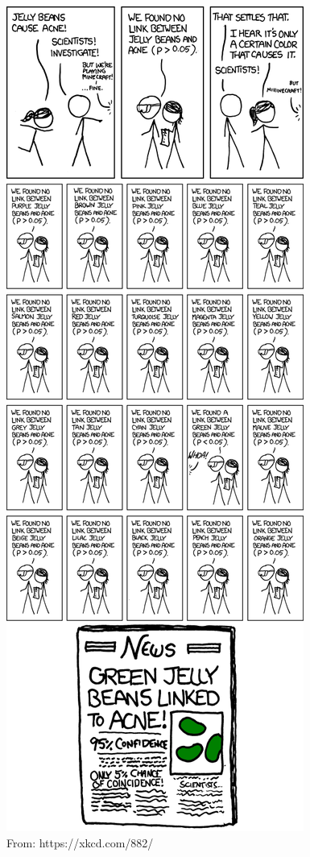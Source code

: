 \documentclass[]{book}
\theoremstyle{definition}
\theoremstyle{definition}
\theoremstyle{definition}
\theoremstyle{remark}
\begin{document}
\begin{figure}

{\centering \includegraphics{img/xkcd_mult_test} 

}

\caption{From: https://xkcd.com/882/}\label{fig:unnamed-chunk-5}
\end{figure}
\end{document}
